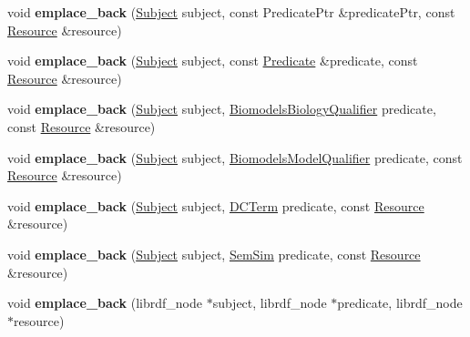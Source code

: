\begin{DoxyCompactItemize}
void {\bfseries emplace\+\_\+back} (\hyperlink{classomexmeta_1_1Subject}{Subject} subject, const Predicate\+Ptr \&predicate\+Ptr, const \hyperlink{classomexmeta_1_1Resource}{Resource} \&resource)
\item 
\mbox{\label{classomexmeta_1_1Triples_acab4513889a9a42c77b3044aac941728}} 
void {\bfseries emplace\+\_\+back} (\hyperlink{classomexmeta_1_1Subject}{Subject} subject, const \hyperlink{classomexmeta_1_1Predicate}{Predicate} \&predicate, const \hyperlink{classomexmeta_1_1Resource}{Resource} \&resource)
\item 
\mbox{\label{classomexmeta_1_1Triples_a862d672c0ac9d877261947cf5a7061db}} 
void {\bfseries emplace\+\_\+back} (\hyperlink{classomexmeta_1_1Subject}{Subject} subject, \hyperlink{classomexmeta_1_1BiomodelsBiologyQualifier}{Biomodels\+Biology\+Qualifier} predicate, const \hyperlink{classomexmeta_1_1Resource}{Resource} \&resource)
\item 
\mbox{\label{classomexmeta_1_1Triples_a87cdc3aacef07c2aebbfe06342bd70f5}} 
void {\bfseries emplace\+\_\+back} (\hyperlink{classomexmeta_1_1Subject}{Subject} subject, \hyperlink{classomexmeta_1_1BiomodelsModelQualifier}{Biomodels\+Model\+Qualifier} predicate, const \hyperlink{classomexmeta_1_1Resource}{Resource} \&resource)
\item 
\mbox{\label{classomexmeta_1_1Triples_a9f3f3152592f99ac95f65e0e7ce3b450}} 
void {\bfseries emplace\+\_\+back} (\hyperlink{classomexmeta_1_1Subject}{Subject} subject, \hyperlink{classomexmeta_1_1DCTerm}{D\+C\+Term} predicate, const \hyperlink{classomexmeta_1_1Resource}{Resource} \&resource)
\item 
\mbox{\label{classomexmeta_1_1Triples_a55e7ed1c3212ae19d2189a386b81422e}} 
void {\bfseries emplace\+\_\+back} (\hyperlink{classomexmeta_1_1Subject}{Subject} subject, \hyperlink{classomexmeta_1_1SemSim}{Sem\+Sim} predicate, const \hyperlink{classomexmeta_1_1Resource}{Resource} \&resource)
\item 
\mbox{\label{classomexmeta_1_1Triples_a3a8c150cff4d1e78aa360d62d3d6604e}} 
void {\bfseries emplace\+\_\+back} (librdf\+\_\+node $\ast$subject, librdf\+\_\+node $\ast$predicate, librdf\+\_\+node $\ast$resource)

\end{DoxyCompactItemize}
